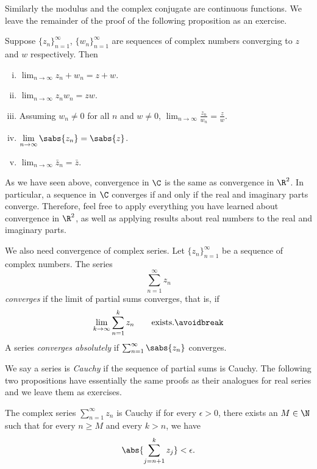 Similarly the modulus and the complex conjugate are continuous functions.  We
leave the remainder of the proof of the following proposition as an exercise.

\begin{prop} \label{prop:continuityofcomplex}
Suppose $\{ z_n \}_{n=1}^\infty$, $\{ w_n \}_{n=1}^\infty$ are sequences of complex numbers converging
to $z$ and $w$ respectively.  Then
\begin{enumerate}[(i)]
\item
$\displaystyle \lim_{n\to \infty} z_n + w_n = z + w$.
\item
$\displaystyle \lim_{n\to \infty} z_n w_n = z w$.
\item
Assuming $w_n \not= 0$ for all $n$ and $w\not= 0$,
$\displaystyle \lim_{n\to \infty} \frac{z_n}{w_n} = \frac{z}{w}$.
\item
$\displaystyle \lim_{n\to \infty} \sabs{z_n} = \sabs{z}$.
\item
$\displaystyle \lim_{n\to \infty} \bar{z}_n = \bar{z}$.
\end{enumerate}
\end{prop}

As we have seen above, convergence in $\C$ is the same as convergence in
$\R^2$.  In particular, a sequence in $\C$ converges if and only if
the real and imaginary parts converge.  Therefore, feel free to apply
everything you have learned about convergence in $\R^2$, as well as
applying results about real numbers to the real and imaginary parts.

We also need convergence of complex series.  Let $\{ z_n \}_{n=1}^\infty$ be a
sequence of complex
numbers. The series
\begin{equation*}
\sum_{n=1}^\infty z_n
\end{equation*}
\emph{converges} if the limit of partial sums converges, that is, if
\begin{equation*}
\lim_{k\to\infty} \sum_{n=1}^k z_n \qquad \text{exists.}
\avoidbreak
\end{equation*}
A series \emph{converges absolutely}
if $\sum_{n=1}^\infty \sabs{z_n}$ converges.

We say a series
is \emph{Cauchy}
if the sequence of partial sums is Cauchy.  The following two
propositions have essentially the same proofs
as their analogues for real series and we
leave them as exercises.

\begin{prop} \label{prop:cachysercomplex}
The complex series $\sum_{n=1}^\infty z_n$ is Cauchy if for every $\epsilon > 0$, 
there exists an $M \in \N$ such that for every $n \geq M$
and every $k > n$, we have
\begin{equation*}
\abs{ \sum_{j={n+1}}^k z_j }
< \epsilon .
\end{equation*}
\end{prop}

